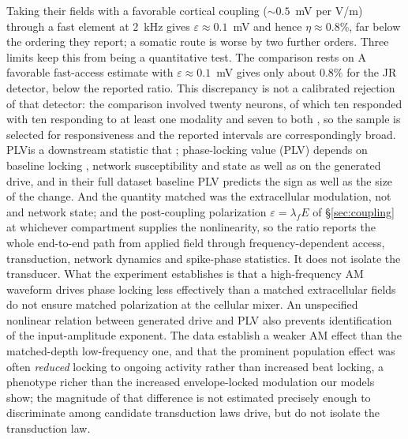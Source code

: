 \documentclass[11pt,a4paper]{article}
\providecommand{\DIFaddtex}[1]{{\protect\color{blue} \sf #1}} %
\providecommand{\DIFdeltex}[1]{{\protect\color{red} \scriptsize #1}} %
\providecommand{\DIFaddbegin}{} %
\providecommand{\DIFaddend}{} %
\providecommand{\DIFdelbegin}{} %
\providecommand{\DIFdelend}{} %
\providecommand{\DIFadd}[1]{\texorpdfstring{\DIFaddtex{#1}}{#1}} %
\providecommand{\DIFdel}[1]{\texorpdfstring{\DIFdeltex{#1}}{}} %
\begin{document}
\DIFdel{Taking their fields with a favorable cortical coupling ($\sim 0.5$~mV per V/m) through a
fast element at $2$~kHz gives $\varepsilon\!\approx\!0.1$~mV and hence
$\eta\!\approx\!0.8\%$, far below the
ordering they report; a somatic route is worse by two
further orders. Three limits keep this from being a quantitative test. The comparison rests
on }\DIFdelend \DIFaddbegin \DIFadd{A favorable fast-access estimate with
$\varepsilon\approx0.1$~mV gives only about $0.8\%$ for the JR detector, below the
reported ratio. This discrepancy is not a calibrated rejection of that detector:
the comparison involved }\DIFaddend twenty neurons, \DIFdelbegin \DIFdel{of which ten responded }\DIFdelend \DIFaddbegin \DIFadd{with ten responding }\DIFaddend to at least one
modality and seven to both\DIFdelbegin \DIFdel{, so
the sample is selected for responsiveness and the reported intervals are correspondingly
broad. PLVis a downstream statistic that }\DIFdelend \DIFaddbegin \DIFadd{; phase-locking value (PLV) }\DIFaddend depends on baseline locking
\DIFdelbegin \DIFdel{, network
susceptibility and state as well as on the generated drive, and in their full dataset
baseline PLV predicts the sign as well as the size of the change. And the quantity matched was the extracellular modulation, not }\DIFdelend \DIFaddbegin \DIFadd{and network state; and }\DIFaddend the \DIFdelbegin \DIFdel{post-coupling polarization $\varepsilon=\lambda_f E$ of \S\ref{sec:coupling} at whichever compartment supplies the nonlinearity, so the ratio reports the whole end-to-end path from applied field through
frequency-dependent access, transduction, network dynamics and spike-phase statistics. It
does not isolate the transducer. What the experiment establishes is that a high-frequency
AM waveform drives phase locking less effectively than a }\DIFdelend \DIFaddbegin \DIFadd{matched extracellular fields do not ensure matched
polarization at the cellular mixer. An unspecified nonlinear relation between
generated drive and PLV also prevents identification of the input-amplitude
exponent. The data establish a weaker AM effect than the }\DIFaddend matched-depth
low-frequency \DIFdelbegin \DIFdel{one, and that the prominent population effect was often \emph{reduced} locking to ongoing
activity rather than increased beat locking, a phenotype richer than the increased
envelope-locked modulation our models show;
the magnitude of that difference is not estimated precisely enough to discriminate among
candidate transduction laws}\DIFdelend \DIFaddbegin \DIFadd{drive, but do not isolate the transduction law}\DIFaddend .
\end{document}
